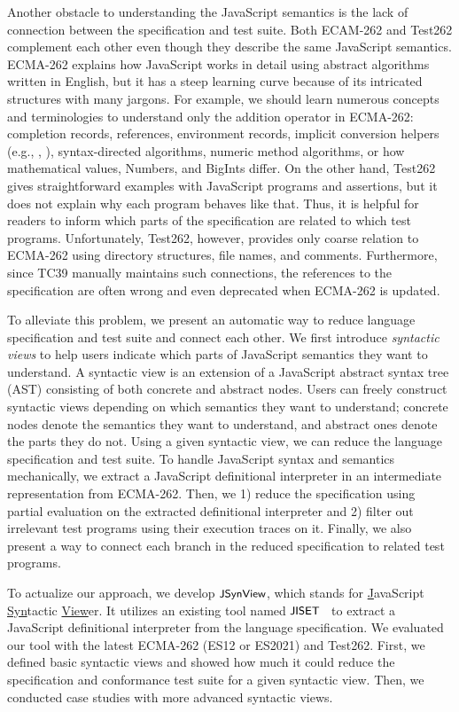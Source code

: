 Another obstacle to understanding the JavaScript semantics is the lack of
connection between the specification and test suite.  Both ECAM-262 and Test262
complement each other even though they describe the same JavaScript semantics.
ECMA-262 explains how JavaScript works in detail using abstract algorithms
written in English, but it has a steep learning curve because of its intricated
structures with many jargons.  For example, we should learn numerous concepts
and terminologies to understand only the addition operator in ECMA-262:
completion records, references, environment records, implicit conversion helpers
(e.g., , ), syntax-directed algorithms,
numeric method algorithms, or how mathematical values, Numbers, and BigInts
differ.  On the other hand, Test262 gives straightforward examples with
JavaScript programs and assertions, but it does not explain why each program
behaves like that.  Thus, it is helpful for readers to inform which parts of the
specification are related to which test programs.  Unfortunately, Test262,
however, provides only coarse relation to ECMA-262 using directory structures,
file names, and comments.  Furthermore, since TC39 manually maintains such
connections, the references to the specification are often wrong and even
deprecated when ECMA-262 is updated.

To alleviate this problem, we present an automatic way to reduce language
specification and test suite and connect each other.  We first introduce
\textit{syntactic views} to help users indicate which parts of JavaScript
semantics they want to understand.  A syntactic view is an extension of a
JavaScript abstract syntax tree (AST) consisting of both concrete and abstract
nodes.  Users can freely construct syntactic views depending on which semantics
they want to understand; concrete nodes denote the semantics they want to
understand, and abstract ones denote the parts they do not.  Using a given
syntactic view, we can reduce the language specification and test suite.  To
handle JavaScript syntax and semantics mechanically, we extract a JavaScript
definitional interpreter in an intermediate representation from ECMA-262.  Then,
we 1) reduce the specification using partial evaluation on the extracted
definitional interpreter and 2) filter out irrelevant test programs using their
execution traces on it.  Finally, we also present a way to connect each branch
in the reduced specification to related test programs.

To actualize our approach, we develop $\textsf{\small JSynView}$, which stands for
\underline{J}avaScript \underline{Syn}tactic \underline{View}er.  It utilizes an
existing tool named $\textsf{\small JISET}$~\cite{jiset} to extract a JavaScript definitional
interpreter from the language specification.  We evaluated our tool with the
latest ECMA-262 (ES12 or ES2021) and Test262.  First, we defined 
basic syntactic views and showed how much it could reduce the specification and
conformance test suite for a given syntactic view. Then, we conducted
 case studies with more advanced syntactic views.

